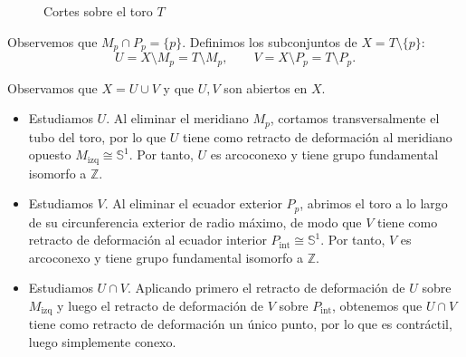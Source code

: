 \documentclass[12pt]{article}
\begin{document}
\begin{ejercicio}
\begin{figure}[htbp]
            \caption{Cortes sobre el toro $T$}
            \label{fig:toro_cortes}
        \end{figure}

        Observemos que $M_p \cap P_p = \{p\}$. Definimos los subconjuntos de $X = T \setminus \{p\}$:
        \[
        U = X \setminus M_p = T \setminus M_p, \qquad V = X \setminus P_p = T \setminus P_p.
        \]

        Observamos que $X=U \cup V$ y que $U,V$ son abiertos en $X$.
        \begin{itemize}
            \item Estudiamos $U$. Al eliminar el meridiano $M_p$, cortamos transversalmente el tubo del toro, por lo que $U$ tiene como retracto de deformación al meridiano opuesto $M_{\text{izq}} \cong \mathbb{S}^1$. Por tanto, $U$ es arcoconexo y tiene grupo fundamental isomorfo a $\mathbb{Z}$.
            \item Estudiamos $V$. Al eliminar el ecuador exterior $P_p$, abrimos el toro a lo largo de su circunferencia exterior de radio máximo, de modo que $V$ tiene como retracto de deformación al ecuador interior $P_{\text{int}} \cong \mathbb{S}^1$. Por tanto, $V$ es arcoconexo y tiene grupo fundamental isomorfo a $\mathbb{Z}$.
            \item Estudiamos $U \cap V$. Aplicando primero el retracto de deformación de $U$ sobre $M_{\text{izq}}$ y luego el retracto de deformación de $V$ sobre $P_{\text{int}}$, obtenemos que $U \cap V$ tiene como retracto de deformación un único punto, por lo que es contráctil, luego simplemente conexo.
        \end{itemize}


\end{ejercicio}
\end{document}
